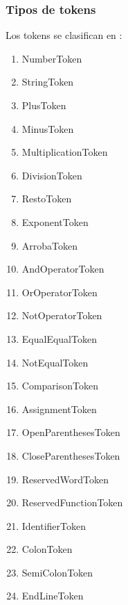 \documentclass[12pt]{article}
\begin{document}
	\subsubsection{Tipos de tokens}
	Los tokens se clasifican en :
	\begin{enumerate}
		\item NumberToken
		\item StringToken
		\item PlusToken	
		\item MinusToken
		\item MultiplicationToken
		\item DivisionToken
		\item RestoToken
		\item ExponentToken
		\item ArrobaToken
		\item AndOperatorToken
		\item OrOperatorToken
		\item NotOperatorToken
		\item EqualEqualToken
		\item NotEqualToken
		\item ComparisonToken
		\item AssignmentToken
		\item OpenParenthesesToken
		\item CloseParenthesesToken
		\item ReservedWordToken
		\item ReservedFunctionToken
		\item IdentifierToken
		\item ColonToken
		\item SemiColonToken
		\item EndLineToken
	\end{enumerate}
	
	
\end{document}
